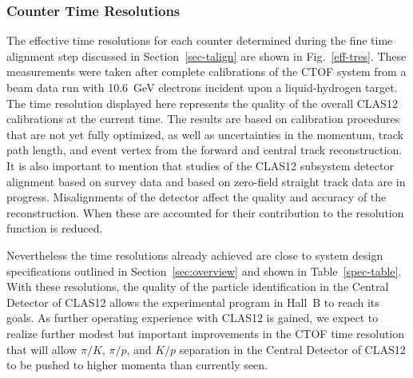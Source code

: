 \documentclass{elsart}
\begin{document}
\subsubsection{Counter Time Resolutions}
\label{tres-beam}

The effective time resolutions for each counter determined during the fine time alignment step
discussed in Section~\ref{sec-talign} are shown in Fig.~\ref{eff-tres}. These measurements were
taken after complete calibrations of the CTOF system from a beam data run with 10.6~GeV electrons
incident upon a liquid-hydrogen target. The time resolution displayed here represents the quality of the
overall CLAS12 calibrations at the current time. The results are based on calibration procedures that
are not yet fully optimized, as well as uncertainties in the momentum, track path length, and event vertex
from the forward and central track reconstruction. It is also important to mention that studies of the
CLAS12 subsystem detector alignment based on survey data and based on zero-field straight track data
are in progress. Misalignments of the detector affect the quality and accuracy of the reconstruction.
When these are accounted for their contribution to the resolution function is reduced.

Nevertheless the time resolutions already achieved are close to system design specifications outlined in
Section~\ref{sec:overview} and shown in Table~\ref{spec-table}. With these resolutions, the quality of the
particle identification in the Central Detector of CLAS12 allows the experimental program in Hall~B to reach
its goals. As further operating experience with CLAS12 is gained, we expect to realize further modest but
important improvements in the CTOF time resolution that will allow $\pi/K$, $\pi/p$, and $K/p$ separation
in the Central Detector of CLAS12 to be pushed to higher momenta than currently seen.
\end{document}
